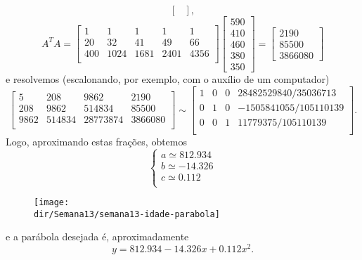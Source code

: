 \documentclass[../livro.tex]{subfiles}  %
\providecommand{\dir}{..}
\begin{document}
\begin{example}
\begin{equation}
\begin{bmatrix}
  \end{bmatrix},
  \end{equation}
  \begin{equation}
  A^T A =
  \begin{bmatrix}
    1 & 1 & 1 & 1 & 1 \\
    20 & 32 & 41 & 49 & 66 \\
    400 & 1024 & 1681 & 2401 & 4356 \\
  \end{bmatrix}
  \begin{bmatrix}
    590 \\ 410 \\ 460 \\ 380 \\ 350
  \end{bmatrix} =
  \begin{bmatrix}
    2190 \\ 85500 \\ 3866080
  \end{bmatrix}
  \end{equation} e resolvemos (escalonando, por exemplo, com o auxílio de um computador)
  \begin{equation}
  \begin{bmatrix}
    5 & 208 & 9862 & 2190 \\
    208 & 9862 & 514834 & 85500 \\
    9862 & 514834 & 28773874 & 3866080 \\
  \end{bmatrix} \sim
  \begin{bmatrix}
    1 & 0 & 0 & 28482529840/35036713 \\
    0 & 1 & 0 & -1505841055/105110139 \\
    0 & 0 & 1 & 11779375/105110139 \\
  \end{bmatrix}.
  \end{equation} 
  Logo, aproximando estas frações, obtemos
  \begin{equation}
  \left\{
    \begin{array}{ll}
      a \simeq 812.934 \\
      b \simeq -14.326 \\
      c \simeq  0.112 \\
    \end{array}
  \right.
  \end{equation} 
  \begin{figure}[h!]
  	\begin{center}
  		\texttt{[image: \\dir/Semana13/semana13-idade-parabola]}
  	\end{center}
  \end{figure}
  e a parábola desejada é, aproximadamente
  \begin{equation}
  y = 812.934 - 14.326 x + 0.112 x^2.
  \end{equation}
  


\end{example}
\end{document}

